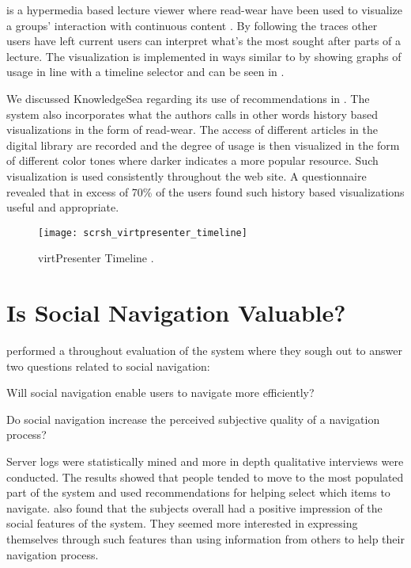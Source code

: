 is a hypermedia based lecture viewer where read-wear
have been used to visualize a groups' interaction with continuous content
\citep{mertens06}. By following the traces other users have left current users
can interpret what's the most sought after parts of a lecture. The
visualization is implemented in ways similar to \citet{hill92} by showing
graphs of usage in line with a timeline selector and can be seen in
.

We discussed KnowledgeSea regarding its use of recommendations in
.
The system also incorporates what the authors calls
\citep[]{brusilovsky05}\dash{}in other words history based
visualizations in the form of read-wear. The access of different articles in
the digital library are recorded and the degree of usage is then visualized in
the form of different color tones where darker indicates a more popular
resource. Such visualization is used consistently throughout the web site. A
questionnaire revealed that in excess of 70\%
\citeyearpar[p.15]{brusilovsky05} of the users
found such history based visualizations useful and appropriate.

\begin{figure}
  \texttt{[image: scrsh\_virtpresenter\_timeline]}
  \caption[virtPresenter Timeline]{
    virtPresenter Timeline \citep[]{mertens06}.
  }
  \label{figure:scrsh.virtpresenter.timeline}
\end{figure}

\section{Is Social Navigation Valuable?}

\citet{svensson05} performed a throughout evaluation of the %
system where they sough out to answer two questions related to social
navigation:

\begin{enum}
  \item Will social navigation enable users to navigate more efficiently?
  \item Do social navigation increase the perceived subjective quality of
    a navigation process?
\end{enum}

Server logs were statistically mined and more in depth qualitative interviews
were conducted. The results showed that people tended to move to the most
populated part of the system and used recommendations for helping select which
items to navigate. \citeauthor{svensson05} also found that the subjects
overall had a positive impression of the social features of the system. They
seemed more interested in expressing themselves through such features than
using information from others to help their navigation process.

